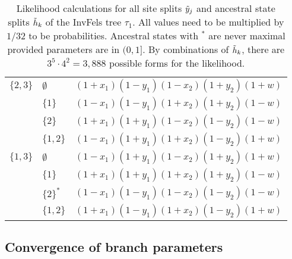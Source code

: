 \begin{table}
\begin{tabular}{|l|ll|}
$\{2,3\}$  &$\emptyset$&$(1+x_1)(1-y_1)(1-x_2)(1+y_2)(1+w)$\\
&$\{1\}$&$(1-x_1)(1-y_1)(1+x_2)(1+y_2)(1-w)$               \\
&$\{2\}$&$(1+x_1)(1+y_1)(1-x_2)(1-y_2)(1-w)$               \\
&$\{1,2\}$&$(1-x_1)(1+y_1)(1+x_2)(1-y_2)(1+w)$             \\

$\{1,3\}$  &$\emptyset$&$(1-x_1)(1+y_1)(1-x_2)(1+y_2)(1+w)$\\
&$\{1\}$&$(1+x_1)(1+y_1)(1+x_2)(1+y_2)(1-w)$               \\
&$\{2\}^*$&$(1-x_1)(1-y_1)(1-x_2)(1-y_2)(1-w)$             \\
&$\{1,2\}$&$(1+x_1)(1-y_1)(1+x_2)(1-y_2)(1+w)$             \\
\hline
\end{tabular}
\caption{
Likelihood calculations for all site splits $\tilde{y}_j$ and ancestral state splits $\tilde{h}_k$ of the InvFels tree $\tau_1$.
All values need to be multiplied by $1/32$ to be probabilities.
Ancestral states with $^*$ are never maximal provided parameters are in $(0,1]$.
By combinations of $\tilde{h}_k$, there are $3^5\cdot 4^2=3,888$ possible forms for the likelihood.
}
\label{tab:farris_likelihoods}
\end{table}


\subsection*{Convergence of branch parameters}

